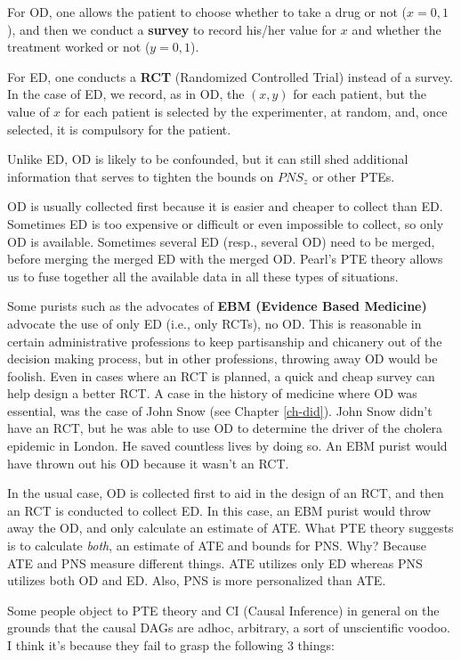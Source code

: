 For OD, one allows
the patient to
choose whether to take
a drug
or not ($x=0,1$),
and then we conduct a {\bf survey}
to record his/her
value for $x$
and whether the treatment
worked or not ($y=0,1$).

For ED, one conducts a {\bf RCT}
(Randomized Controlled Trial)
instead of a survey.
In the case of ED,
we record, as in OD, the $(x,y)$
for each patient, but
the value of $x$ for each
patient is selected by the
experimenter, at random,
and, once selected, it
 is compulsory for the
patient.

Unlike ED, OD is likely
to be confounded, but
it can still shed
additional information
that serves to tighten
the bounds on
$PNS_z$ or other PTEs.

OD is usually collected first
because it is easier and cheaper to collect
than ED. Sometimes ED is too expensive or difficult
or even impossible to collect,
so only OD is available.
Sometimes several ED (resp., several OD)
need to be merged, before merging
the merged ED with the merged OD. Pearl's PTE theory
allows us to fuse together all the
available data
in all these types of
situations.

Some purists such as the advocates of {\bf EBM (Evidence Based Medicine)}
advocate the use of only ED (i.e., only RCTs), no OD. This is reasonable in
certain administrative  professions to keep partisanship and chicanery out of
the decision making process, but in other professions, throwing away OD would
be foolish. Even in cases where an RCT is planned, a quick and cheap survey
can help design a better RCT. A case in the history of medicine where OD was
essential, was the case of John Snow (see Chapter \ref{ch-did}). John Snow
didn't have an RCT, but he was able to use OD to determine the driver of the
cholera epidemic in London. He saved countless lives by doing so. An EBM
purist would have thrown out his OD because it wasn't an RCT.

In the usual case, OD is collected first to aid in the design of an RCT, and
then an RCT is conducted to collect ED. In this case, an EBM purist would
throw away the OD, and only calculate an estimate of ATE.
What PTE theory
suggests is to calculate {\it both}, an estimate of ATE and bounds for PNS.
Why? Because ATE and PNS measure different things. ATE utilizes only ED
whereas PNS utilizes both OD and ED. Also, PNS is more personalized than ATE.

Some people object to PTE theory
and CI (Causal Inference) in general on the
grounds that the causal DAGs
 are adhoc, arbitrary, a
sort of unscientific voodoo. I think it’s because they fail to grasp the
following 3 things:

